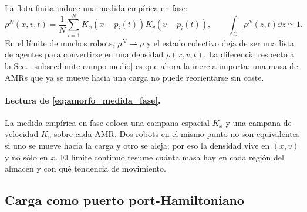 La flota finita induce una medida empírica en fase:
\begin{equation}
  \rho^N(x,v,t)
  =
  \frac1N\sum_{i=1}^N
  K_x(x-p_i(t))K_v(v-\dot p_i(t)),
  \qquad
  \int_{\mathcal Z}\rho^N(z,t)\dd z\simeq1 .
  \label{eq:amorfo_medida_fase}
\end{equation}
En el límite de muchos robots, $\rho^N\rightharpoonup\rho$ y el estado colectivo deja de
ser una lista de agentes para convertirse en una densidad $\rho(x,v,t)$. La diferencia
respecto a la Sec.~\ref{subsec:limite-campo-medio} es que ahora la inercia importa: una
masa de AMRs que ya se mueve hacia una carga no puede reorientarse sin coste.

\paragraph{Lectura de \eqref{eq:amorfo_medida_fase}.}
La medida empírica en fase coloca una campana espacial $K_x$ y una campana de velocidad
$K_v$ sobre cada AMR. Dos robots en el mismo punto no son equivalentes si uno se mueve
hacia la carga y otro se aleja; por eso la densidad vive en $(x,v)$ y no sólo en $x$.
El límite continuo resume cuánta masa hay en cada región del almacén y con qué tendencia
de movimiento.

\subsection{Carga como puerto port-Hamiltoniano}
\label{subsec:amorfo-carga-ph}


